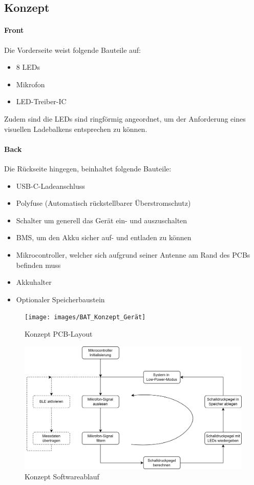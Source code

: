 \documentclass[12pt]{article}
\begin{document}
	\subsection{Konzept}
	\paragraph{Front}
	Die Vorderseite weist folgende Bauteile auf:
	\begin{itemize}
		\item 8 LEDs
		\item Mikrofon
		\item LED-Treiber-IC
	\end{itemize}
	Zudem sind die LEDs sind ringförmig angeordnet, um der Anforderung eines visuellen Ladebalkens entsprechen zu können.
	\paragraph{Back}
	Die Rückseite hingegen, beinhaltet folgende Bauteile:
	\begin{itemize}
		\item USB-C-Ladeanschluss
		\item Polyfuse (Automatisch rückstellbarer Überstromschutz)
		\item Schalter um generell das Gerät ein- und auszuschalten
		\item BMS, um den Akku sicher auf- und entladen zu können
		\item Mikrocontroller, welcher sich aufgrund seiner Antenne am Rand des PCBs befinden muss
		\item Akkuhalter
		\item Optionaler Speicherbaustein
	\end{itemize}
	\begin{figure}[H]
		\centering
		\texttt{[image: images/BAT\_Konzept\_Gerät]}
		\caption{Konzept PCB-Layout}
		\label{fig:batkonzeptgerat}
	\end{figure}
	\begin{figure}[H]
		\centering
		\includegraphics[width=1\linewidth]{images/BAT_Konzept_Softwareablauf}
		\caption{Konzept Softwareablauf}
		\label{fig:batkonzeptsoftwareablauf}
	\end{figure}
	
\end{document}
